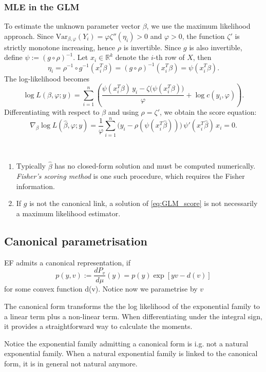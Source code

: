 \subsubsection*{MLE in the GLM}

To estimate the unknown parameter vector $\beta$, we use the maximum likelihood approach. Since $\mathrm{Var}_{\beta,\varphi}(Y_i) = \varphi \zeta''(\eta_i) > 0$ and $\varphi > 0$, the function $\zeta'$ is strictly monotone increasing, hence $\rho$ is invertible. Since $g$ is also invertible, define $\psi := (g \circ \rho)^{-1}$. Let $x_i \in \mathbb{R}^k$ denote the $i$-th row of $X$, then
\begin{equation*}
	\eta_i = \rho^{-1} \circ g^{-1}(x_i^T\beta) = (g \circ \rho)^{-1}(x_i^T\beta) = \psi(x_i^T\beta).
\end{equation*}
The log-likelihood becomes
\begin{equation}
	\log L(\beta, \varphi; y) = \sum_{i=1}^n \left( \frac{\psi(x_i^T\beta)\, y_i - \zeta\big(\psi(x_i^T\beta)\big)}{\varphi} + \log c(y_i, \varphi) \right).
\end{equation}
Differentiating with respect to $\beta$ and using $\rho = \zeta'$, we obtain the score equation:
\begin{equation} \label{eq:GLM_score}
	\nabla_\beta \log L(\hat{\beta}, \varphi; y) = \frac{1}{\varphi} \sum_{i=1}^n \big(y_i - \rho(\psi(x_i^T\hat{\beta}))\big)\, \psi'(x_i^T\hat{\beta})\, x_i = 0.
\end{equation}

\begin{remark} ~
\begin{enumerate}
	\item Typically $\hat{\beta}$ has no closed-form solution and must be computed numerically. \emph{Fisher's scoring method} is one such procedure, which requires the Fisher information.
	\item If $g$ is not the canonical link, a solution of \eqref{eq:GLM_score} is not necessarily a maximum likelihood estimator.
\end{enumerate}
\end{remark}

\subsection{Canonical parametrisation}
\begin{definition}
	EF admits a canonical representation, if
	\begin{equation} \label{DF:EFc}
		p(y, v) := \frac{dP_v}{d\mu}(y) = p(y)\exp [yv - d(v)]
	\end{equation}
	for some convex function d(v). Notice now we parametrise by $v$
\end{definition}
The canonical form transforms the the log likelihood of the exponential family to a linear term plus a non-linear term. When differentiating under the integral sign, it provides a straightforward way to calculate the moments.\par 
Notice the exponential family admitting a canonical form is i.g. not a natural exponential family. When a natural exponential family is linked to the canonical form, it is in general not natural anymore.
